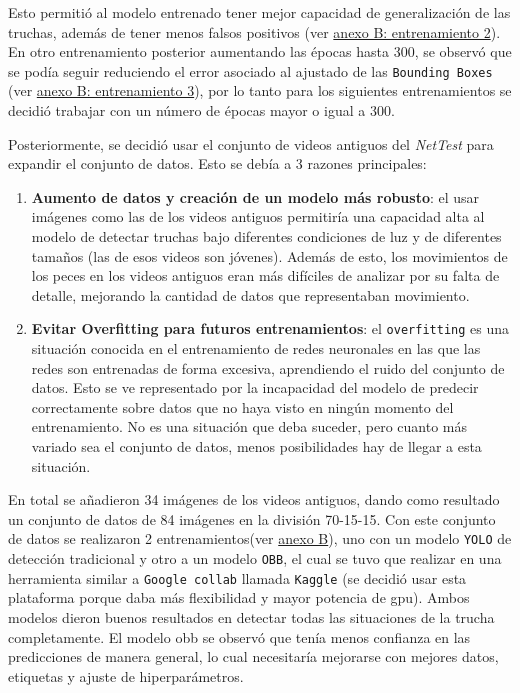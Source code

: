 Esto permitió al modelo entrenado tener mejor capacidad de generalización de las truchas, además de tener menos falsos positivos (ver \hyperref[train:2]{anexo B: entrenamiento 2}). En otro entrenamiento 
posterior aumentando las épocas hasta 300, se observó que se podía seguir reduciendo el error asociado al ajustado de las \texttt{Bounding Boxes} (ver \hyperref[train:3]{anexo B: entrenamiento 3}), por lo 
tanto para los siguientes entrenamientos se decidió trabajar con un número de épocas mayor o igual a 300.
\clearpage

Posteriormente, se decidió usar el conjunto de videos antiguos del \textit{NetTest} para expandir el conjunto de datos. Esto se debía a 3 razones principales:
\begin{enumerate}
    \item \textbf{Aumento de datos y creación de un modelo más robusto}: el usar imágenes como las de los videos antiguos permitiría una capacidad alta al modelo de detectar truchas bajo diferentes condiciones de luz y de diferentes tamaños (las de esos videos son 
    jóvenes). Además de esto, los movimientos de los peces en los videos antiguos eran más difíciles de analizar por su falta de detalle, mejorando la cantidad de datos que representaban movimiento.
    \item \textbf{Evitar Overfitting para futuros entrenamientos}: el \texttt{overfitting} es una situación conocida en el entrenamiento de redes neuronales en las que las redes son entrenadas de forma excesiva, aprendiendo el ruido
     del conjunto de datos. Esto se ve representado por la incapacidad del modelo de predecir correctamente sobre datos que no haya visto en ningún momento del entrenamiento. No es una situación que deba suceder, pero cuanto más 
    variado sea el conjunto de datos, menos posibilidades hay de llegar a esta situación.
\end{enumerate}

En total se añadieron 34 imágenes de los videos antiguos, dando como resultado un conjunto de datos de 84 imágenes en la división 70-15-15.\newline
Con este conjunto de datos se realizaron 2 entrenamientos(ver \hyperref[train:4]{anexo B}), uno con un modelo \texttt{YOLO} de detección tradicional y otro a un modelo \texttt{OBB}, el cual se tuvo que realizar en una herramienta similar a \texttt{Google collab} 
llamada \texttt{Kaggle} (se decidió usar esta plataforma porque daba más flexibilidad y mayor potencia de \acrshort{gpu}).\newline
Ambos modelos dieron buenos resultados en detectar todas las situaciones de la trucha completamente. 
El modelo \acrshort{obb} se observó que tenía menos confianza en las predicciones de manera general, lo cual necesitaría mejorarse con mejores datos, etiquetas y ajuste de hiperparámetros.

